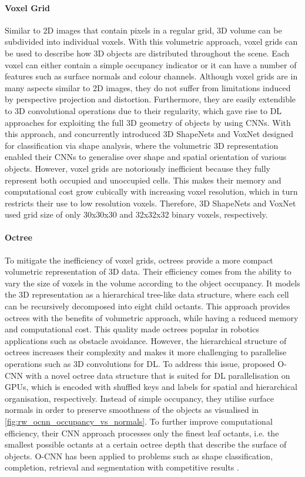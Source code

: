 \paragraph{Voxel Grid} Similar to 2D images that contain pixels in a regular grid, 3D volume can be subdivided into individual voxels. With this volumetric approach, voxel grids can be used to describe how 3D objects are distributed throughout the scene. Each voxel can either contain a simple occupancy indicator or it can have a number of features such as surface normals and colour channels. Although voxel grids are in many aspects similar to 2D images, they do not suffer from limitations induced by perspective projection and distortion. Furthermore, they are easily extendible to 3D convolutional operations due to their regularity, which gave rise to DL approaches for exploiting the full 3D geometry of objects by using CNNs. With this approach, \citet{wu_3d_2015} and \citet{maturana_voxnet_2015} concurrently introduced 3D ShapeNets and VoxNet designed for classification via shape analysis, where the volumetric 3D representation enabled their CNNs to generalise over shape and spatial orientation of various objects. However, voxel grids are notoriously inefficient because they fully represent both occupied and unoccupied cells. This makes their memory and computational cost grow cubically with increasing voxel resolution, which in turn restricts their use to low resolution voxels. Therefore, 3D ShapeNets and VoxNet used grid size of only 30x30x30 and 32x32x32 binary voxels, respectively.


\paragraph{Octree} To mitigate the inefficiency of voxel grids, octrees provide a more compact volumetric representation of 3D data. Their efficiency comes from the ability to vary the size of voxels in the volume according to the object occupancy. It models the 3D representation as a hierarchical tree-like data structure, where each cell can be recursively decomposed into eight child octants. This approach provides octrees with the benefits of volumetric approach, while having a reduced memory and computational cost. This quality made octrees popular in robotics applications such as obstacle avoidance. However, the hierarchical structure of octrees increases their complexity and makes it more challenging to parallelise operations such as 3D convolutions for DL. To address this issue, \citet{wang_o-cnn_2017} proposed O-CNN with a novel octree data structure that is suited for DL parallelisation on GPUs, which is encoded with shuffled keys and labels for spatial and hierarchical organisation, respectively. Instead of simple occupancy, they utilise surface normals in order to preserve smoothness of the objects as visualised in \autoref{fig:rw_ocnn_occupancy_vs_normals}. To further improve computational efficiency, their CNN approach processes only the finest leaf octants, i.e. the smallest possible octants at a certain octree depth that describe the surface of objects. O-CNN has been applied to problems such as shape classification, completion, retrieval and segmentation with competitive results \cite{wang_o-cnn_2017, wang_deep_2020}.

